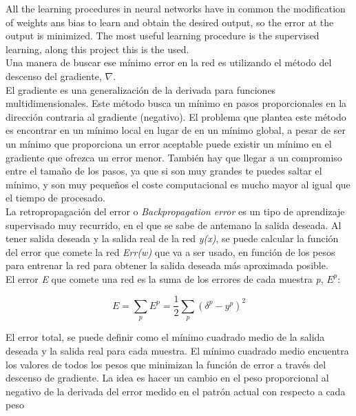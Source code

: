 All the learning procedures in neural networks have in common the modification of weights ans bias to learn and obtain the desired output, so the error at the output is minimized. The most useful learning procedure is the supervised learning, along this project this is the used.\\

Una manera de buscar ese mínimo error en la red es utilizando el método del descenso del gradiente, $\mathit{\nabla}$.\\

El gradiente es una generalización de la derivada para funciones multidimensionales. Este método busca un mínimo en pasos proporcionales en la dirección contraria al gradiente (negativo). El problema que plantea este método es encontrar en un mínimo local en lugar de en un mínimo global, a pesar de ser un mínimo que proporciona un error aceptable puede existir un mínimo en el gradiente que ofrezca un error menor. %
También hay que llegar a un compromiso entre el tamaño de los pasos, ya que si son muy grandes te puedes saltar el mínimo, y son muy pequeños el coste computacional es mucho mayor al igual que el tiempo de procesado.\\

La retropropagación del error o \textit{Backpropagation error} es un tipo de aprendizaje supervisado muy recurrido, en el que se sabe de antemano la salida deseada. Al tener salida deseada y la salida real de la red \textit{y(x)}, se puede calcular la función del error que comete la red \textit{Err(w)} que va a ser usado, en función de los pesos para entrenar la red para obtener la salida deseada más aproximada posible.\\

El error \textit{E} que comete una red es la suma de los errores de cada muestra \textit{p}, $E^{p}$:

\begin{equation}
E=\sum_{p}E^p = \frac{1}{2}\sum_{p}(\delta^p- y^p)^2
\end{equation}

El error total, se puede definir como el mínimo cuadrado medio de la salida deseada y la salida real para cada muestra. El mínimo cuadrado medio encuentra los valores de todos los pesos que minimizan la función de error a través del descenso de gradiente. La idea es hacer un cambio en el peso proporcional al negativo de la derivada del error medido en el patrón actual con respecto a cada peso %

